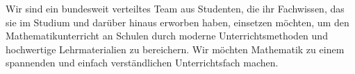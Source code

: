 \documentclass[../main.tex]{subfiles}
\begin{document}
Wir sind ein bundesweit verteiltes Team aus Studenten, die ihr Fachwissen, das sie im Studium und darüber hinaus erworben haben, einsetzen möchten, um den Mathematikunterricht an Schulen durch moderne Unterrichtsmethoden und hochwertige Lehrmaterialien zu bereichern. Wir möchten Mathematik zu einem spannenden und einfach verständlichen Unterrichtsfach machen.

\end{document}
